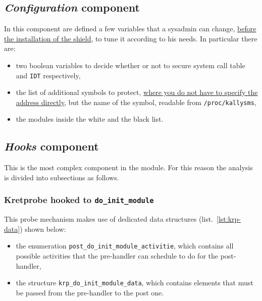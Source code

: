 \documentclass{article}
\begin{document}
	\subsection{\emph{Configuration} component}\label{sec:config}
	In this component are defined a few variables that a sysadmin can change, \ul{before the installation of the
	shield}, to tune it according to his needs. In particular there are:
	\begin{itemize}
		\item two boolean variables to decide whether or not to secure system call table and \texttt{IDT} respectively,
		\item the list of additional symbols to protect, \ul{where you do not have to specify the address directly},
		but the name of the symbol, readable from \texttt{/proc/kallysms},
		\item the modules inside the white and the black list.
	\end{itemize}

	\subsection{\emph{Hooks} component}\label{sec:hooks}
	This is the most complex component in the module. For this reason the analysis is divided into subsections as
	follows.

	\subsubsection{Kretprobe hooked to \texttt{do\_init\_module}}
	This probe mechanism makes use of dedicated data structures (list.~\ref{lst:krp-data}) shown below:
	\begin{itemize}
		\item the enumeration \texttt{post\_do\_init\_module\_activitie}, which contains all possible activities that
		the pre-handler can schedule to do for the post-handler,
		\item the structure \texttt{krp\_do\_init\_module\_data}, which contains elements that must be passed from the
		pre-handler to the post one.
	\end{itemize}
\end{document}
